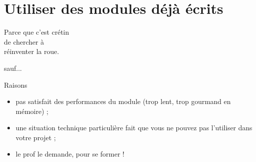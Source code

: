 \documentclass[10pt]{nsibeamer}
\begin{document}
\section{Utiliser des modules déjà écrits}

\begin{frame}[standout]
    Parce que c'est crétin\\
    de chercher à \\
    réinventer la roue.
\end{frame}

\begin{frame}[standout]
    sauf...    
\end{frame}

\begin{frame}[fragile]{Raisons}\pause
    \begin{itemize}
        \item   pas satisfait des performances du module (trop lent, trop gourmand en mémoire) ;\pause
        \item   une situation technique particulière fait que vous ne pouvez pas l'utiliser dans votre projet ;\pause
        \item   le prof le demande, pour se former !
    \end{itemize}
        
\end{frame}
\end{document}
